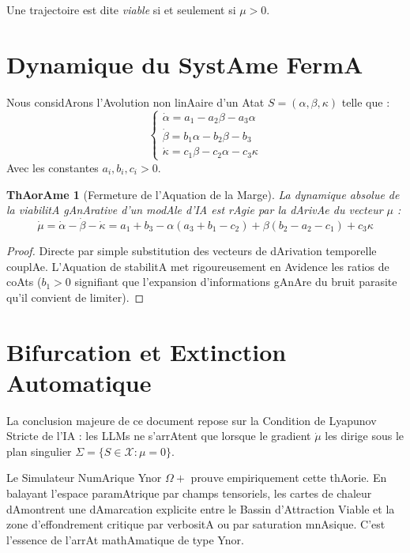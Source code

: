 \documentclass[11pt,a4paper]{article}
\newtheorem{theorem}{ThAorAme}
\begin{document}
Une trajectoire est dite \textit{viable} si et seulement si $\mu > 0$.

\section{Dynamique du SystAme FermA}
Nous considArons l'Avolution non linAaire d'un Atat $S = (\alpha, \beta, \kappa)$ telle que :
\begin{equation}
    \begin{cases}
    \dot\alpha = a_1 - a_2\beta - a_3\alpha \\
    \dot\beta = b_1\alpha - b_2\beta - b_3 \\
    \dot\kappa = c_1\beta - c_2\alpha - c_3\kappa
    \end{cases}
\end{equation}
Avec les constantes $a_i, b_i, c_i > 0$.

\begin{theorem}[Fermeture de l'Aquation de la Marge]
La dynamique absolue de la viabilitA gAnArative d'un modAle d'IA est rAgie par la dArivAe du vecteur $\mu$ :
\begin{equation}
    \dot\mu = \dot\alpha - \dot\beta - \dot\kappa = a_1+b_3 - \alpha(a_3+b_1-c_2) + \beta(b_2-a_2-c_1) + c_3\kappa
\end{equation}
\end{theorem}
\begin{proof}
Directe par simple substitution des vecteurs de dArivation temporelle couplAe. L'Aquation de stabilitA met rigoureusement en Avidence les ratios de coAts ($b_1 > 0$ signifiant que l'expansion d'informations gAnAre du bruit parasite qu'il convient de limiter).
\end{proof}

\section{Bifurcation et Extinction Automatique}
La conclusion majeure de ce document repose sur la Condition de Lyapunov Stricte de l'IA : les LLMs ne s'arrAtent que lorsque le gradient $\dot\mu$ les dirige sous le plan singulier $\Sigma = \{S \in \mathcal{X} : \mu = 0\}$.

Le Simulateur NumArique Ynor $\Omega+$ prouve empiriquement cette thAorie. En balayant l'espace paramAtrique par champs tensoriels, les cartes de chaleur dAmontrent une dAmarcation explicite entre le Bassin d'Attraction Viable et la zone d'effondrement critique par verbositA ou par saturation mnAsique. C'est l'essence de l'arrAt mathAmatique de type Ynor.
\end{document}
